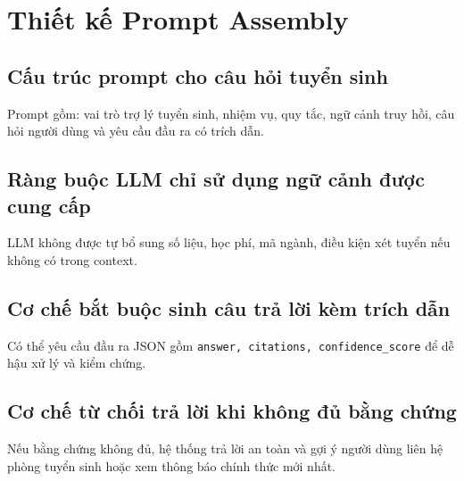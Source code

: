 ﻿\section{Thiết kế Prompt Assembly}

\subsection{Cấu trúc prompt cho câu hỏi tuyển sinh}

Prompt gồm: vai trò trợ lý tuyển sinh, nhiệm vụ, quy tắc, ngữ cảnh truy hồi, câu hỏi người dùng và yêu cầu đầu ra có trích dẫn.

\subsection{Ràng buộc LLM chỉ sử dụng ngữ cảnh được cung cấp}

LLM không được tự bổ sung số liệu, học phí, mã ngành, điều kiện xét tuyển nếu không có trong context.

\subsection{Cơ chế bắt buộc sinh câu trả lời kèm trích dẫn}

Có thể yêu cầu đầu ra JSON gồm \texttt{answer, citations, confidence\_score} để dễ hậu xử lý và kiểm chứng.

\subsection{Cơ chế từ chối trả lời khi không đủ bằng chứng}

Nếu bằng chứng không đủ, hệ thống trả lời an toàn và gợi ý người dùng liên hệ phòng tuyển sinh hoặc xem thông báo chính thức mới nhất.
